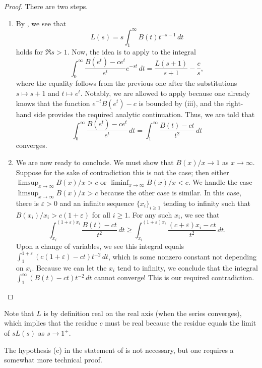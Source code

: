 \documentclass[../thesis.tex]{subfiles}
\begin{document}
\begin{proof}
	There are two steps.
	\begin{enumerate}
		\item By , we see that
		\[L(s)=s\int_1^\infty B(t)t^{-s-1}\,dt\]
		holds for $\Re s>1$. Now, the idea is to apply  to the integral
		\[\int_0^\infty\frac{B(e^{t})-ce^{t}}{e^{t}}e^{-st}\,dt=\frac{L(s+1)}{s+1}-\frac cs,\]
		where the equality follows from the previous one after the substitutions $s\mapsto s+1$ and $t\mapsto e^t$. Notably, we are allowed to apply  because one already knows that the function $e^{-t}B\left(e^t\right)-c$ is bounded by (iii), and the right-hand side provides the required analytic continuation. Thus, we are told that
		\[\int_0^\infty\frac{B(e^{t})-ce^{t}}{e^{t}}\,dt=\int_1^\infty\frac{B(t)-ct}{t^2}\,dt\]
		converges.
		\item We are now ready to conclude. We must show that $B(x)/x\to1$ as $x\to\infty$. Suppose for the sake of contradiction this is not the case; then either $\limsup_{x\to\infty} B(x)/x>c$ or $\liminf_{x\to\infty} B(x)/x<c$. We handle the case $\limsup_{x\to\infty} B(x)/x>c$ because the other case is similar. In this case, there is $\varepsilon>0$ and an infinite sequence $\{x_i\}_{i\ge1}$ tending to infinity such that $B(x_i)/x_i>c(1+\varepsilon)$ for all $i\ge1$. For any such $x_i$, we see that
		\[\int_{x_i}^{(1+\varepsilon) x_i}\frac{B(t)-ct}{t^2}\,dt\ge\int_{x_i}^{(1+\varepsilon) x_i}\frac{(c+\varepsilon) x_i-ct}{t^2}\,dt.\]
		Upon a change of variables, we see this integral equals $\int_1^{1+\varepsilon}(c(1+\varepsilon)-ct)t^{-2}\,dt$, which is some nonzero constant not depending on $x_i$. Because we can let the $x_i$ tend to infinity, we conclude that the integral $\int_1^\infty(B(t)-ct)t^{-2}\,dt$ cannot converge! This is our required contradiction.
		\qedhere
	\end{enumerate}
\end{proof}
\begin{remark}
	Note that $L$ is by definition real on the real axis (when the series converges), which implies that the residue $c$ must be real because the residue equals the limit of $sL(s)$ as $s\to1^+$.
\end{remark}
\begin{remark}
	The hypothesis (c) in the statement of  is not necessary, but one requires a somewhat more technical proof.
\end{remark}
\end{document}
